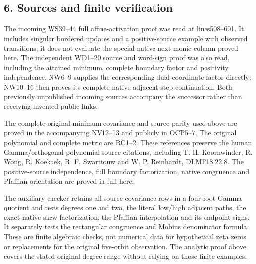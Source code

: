 \documentclass[11pt]{article}
\begin{document}
\subsection{6. Sources and finite verification}\label{part4-sources-and-finite-verification}

The incoming \href{../whole_space_arrival_029/inputs/Whole_Space_Signs_20260922/COMPLETE_PROOFS.md}{WS39--44 full affine-activation proof} was read at lines508--601. It includes singular bordered updates and a positive-source example with observed transitions; it does not evaluate the special native next-monic column proved here. The independent \href{../whole_space_arrival_029/word_derivation/WORD_SIGNATURE_PROOF.md}{WD1--20 source and word-sign proof} was also read, including the attained minimum, complete boundary factor and positivity independence. NW6--9 supplies the corresponding dual-coordinate factor directly; NW10--16 then proves its complete native adjacent-step continuation. Both previously unpublished incoming sources accompany the successor rather than receiving invented public links.

The complete original minimum covariance and source parity used above are proved in the accompanying \href{NATIVE_SOURCE_STEP_PROOF.md}{NV12--13} and publicly in \href{https://github.com/KokunoYumeto/zeta-function-research-reader/blob/5c69161ca70ee187f41df0bfe786e8b6eebed422/workbenches/splitzero-tandem/continuations/20260922-current-effective-cutoff/OBSERVED_CURRENT_PLANE.tex\#L90}{OCP5--7}. The original polynomial and complete metric are \href{https://github.com/KokunoYumeto/zeta-function-research-reader/blob/5c69161ca70ee187f41df0bfe786e8b6eebed422/workbenches/splitzero-tandem/continuations/20260922-current-effective-cutoff/CUTOFF_CURRENT_CONNECTION.md\#L7}{RC1--2}. These references preserve the human Gamma/orthogonal-polynomial source citations, including T. H. Koornwinder, R. Wong, R. Koekoek, R. F. Swarttouw and W. P. Reinhardt, DLMF18.22.8. The positive-source independence, full boundary factorization, native congruence and Pfaffian orientation are proved in full here.

The auxiliary checker retains all source covariance rows in a four-root Gamma quotient and tests degrees one and two, the literal low/high adjacent paths, the exact native skew factorization, the Pfaffian interpolation and its endpoint signs. It separately tests the rectangular congruence and Möbius denominator formula. These are finite algebraic checks, not numerical data for hypothetical zeta zeros or replacements for the original five-orbit observation. The analytic proof above covers the stated original degree range without relying on those finite examples.
\end{document}
